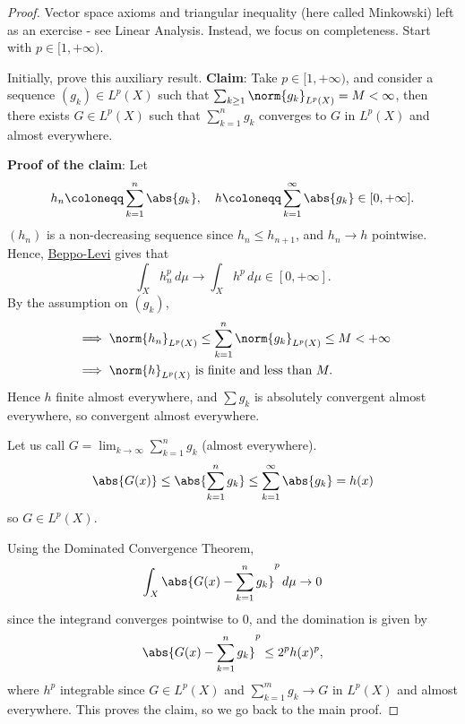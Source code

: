 \documentclass{article}
\begin{document}
\begin{proof}
    Vector space axioms and triangular inequality (here called Minkowski) left as an exercise - see Linear Analysis.
    Instead, we focus on completeness. Start with $p \in [1, +\infty)$.

    Initially, prove this auxiliary result.
    \textbf{Claim}: Take $p \in [1, +\infty)$, and consider a sequence $(g_k) \in L^p(X)$ such that $\sum_{k \geq 1} \norm{g_k}_{L^p(X)} = M < \infty$, then there exists $G \in L^p(X)$ such that $\sum_{k=1}^n g_k$ converges to $G$ in $L^p(X)$ and almost everywhere.

    \textbf{Proof of the claim}: Let
    \begin{equation*}
        h_n \coloneqq \sum_{k=1}^n \abs{g_k}, \quad h \coloneqq \sum_{k=1}^\infty \abs{g_k} \in [0, +\infty].
    \end{equation*}
    $(h_n)$ is a non-decreasing sequence since $h_n \leq h_{n+1}$, and $h_n \to h$ pointwise.
    Hence, \hyperlink{thm:Beppo}{Beppo-Levi} gives that
    \begin{equation*}
        \int_X h_n^p \, d\mu \to \int_X h^p  \, d\mu \in [0, +\infty].
    \end{equation*}
    By the assumption on $(g_k)$,
    \begin{align*}
        &\implies \norm{h_n}_{L^p(X)} \leq \sum_{k=1}^n \norm{g_k}_{L^p(X)} \leq M < +\infty \\
        &\implies \norm{h}_{L^p(X)} \text{ is finite and less than } M.
    \end{align*}
    Hence $h$ finite almost everywhere, and $\sum g_k$ is absolutely convergent almost everywhere, so convergent almost everywhere.

    Let us call $G = \lim_{k \to \infty} \sum_{k=1}^n g_k$ (almost everywhere).
    \begin{equation*}
        \abs{G(x)} \leq \abs{\sum_{k=1}^n g_k} \leq \sum_{k=1}^\infty \abs{g_k} = h(x)
    \end{equation*}
    so $G \in L^p(X)$.

    Using the Dominated Convergence Theorem,
    \begin{equation*}
        \int_X \abs{G(x) - \sum_{k=1}^n g_k}^p \, d\mu \to 0
    \end{equation*}
    since the integrand converges pointwise to 0, and the domination is given by
    \begin{equation*}\abs{G(x) - \sum_{k=1}^n g_k}^p \leq 2^p h(x)^p,\end{equation*} where $h^p$ integrable since $G \in L^p(X)$ and $\sum_{k=1}^m g_k \to G$ in $L^p(X)$ and almost everywhere.
    This proves the claim, so we go back to the main proof.


\end{proof}
\end{document}
